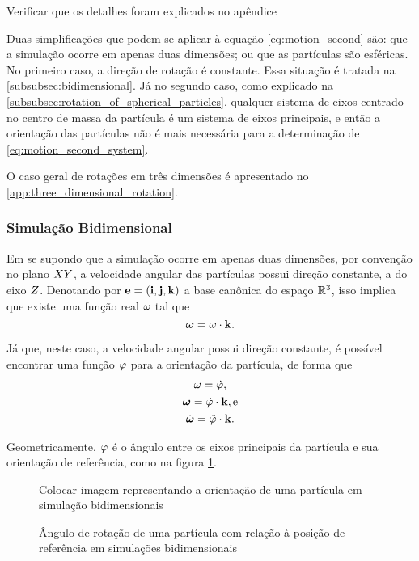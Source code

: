 \alert{Verificar que os detalhes foram explicados no apêndice}

Duas simplificações que podem se aplicar à equação \eqref{eq:motion_second} são: que a simulação ocorre em apenas duas dimensões; ou que as partículas são esféricas. No primeiro caso, a direção de rotação é constante. Essa situação é tratada na \autoref{subsubsec:bidimensional}. Já no segundo caso, como explicado na \autoref{subsubsec:rotation_of_spherical_particles}, qualquer sistema de eixos centrado no centro de massa da partícula é um sistema de eixos principais, e então a orientação das partículas não é mais necessária para a determinação de \eqref{eq:motion_second_system}.

O caso geral de rotações em três dimensões é apresentado no \autoref{app:three_dimensional_rotation}.

\subsubsection{Simulação Bidimensional} \label{subsubsec:bidimensional}

Em se supondo que a simulação ocorre em apenas duas dimensões, por convenção no plano \(XY\), a velocidade angular das partículas possui direção constante, a do eixo \(Z\). Denotando por \(\basis = \pqty{\xUnit, \yUnit, \zUnit}\) a base canônica do espaço \(\mathbb{R}^3\), isso implica que existe uma função real \(\omega\) tal que
\[
	\bm{\omega} = \omega\cdot\mathbf{k}.
\]

Já que, neste caso, a velocidade angular possui direção constante, é possível encontrar uma função \(\varphi\) para a orientação da partícula, de forma que
\begin{gather*}
	\angularVelocityScalar = \deriv{1}{\orientationScalar}, \\
	\angularVelocity = \deriv{1}{\orientationScalar}\cdot\zUnit, \text{e} \\
	\angularAcceleration = \deriv{2}{\orientationScalar}\cdot\zUnit.
\end{gather*}

Geometricamente, \(\varphi\) é o ângulo entre os eixos principais da partícula e sua orientação de referência, como na figura \ref{fig:bidimensional_simulation}.

\begin{figure}[h]
	\caption{Ângulo de rotação de uma partícula com relação à posição de referência em simulações bidimensionais}
	\begin{center}
		\alert{Colocar imagem representando a orientação de uma partícula em simulação bidimensionais}
	\end{center}
	\label{fig:bidimensional_simulation}
\end{figure}

